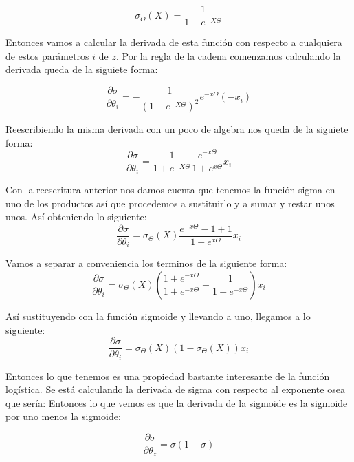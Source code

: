 \begin{equation}
  \sigma_{\Theta}(X) = \dfrac{1}{1+e^{-X\Theta}}
\end{equation}

Entonces vamos a calcular la derivada de esta función con respecto a cualquiera de estos parámetros $i$ de $z$.
Por la regla de la cadena comenzamos calculando la derivada queda de la siguiete forma:

\begin{equation}
 \dfrac{\partial\sigma}{\partial\theta_{i}}= -\dfrac{1}{(1-e^{-X\Theta})^2}e^{-x\Theta}(-x_{i})
\end{equation}

Reescribiendo la misma derivada con un poco de algebra nos queda de la siguiete forma:
\begin{equation}
 \dfrac{\partial\sigma}{\partial\theta_{i}}= \dfrac{1}{1+e^{-X\Theta}}  \dfrac{e^{-x\Theta}}{1+e^{x\Theta}} x_{i}
\end{equation}

Con la reescritura anterior nos damos cuenta que tenemos la función sigma en uno de los productos así que procedemos a sustituirlo y a sumar y restar unos unos. Así obteniendo lo siguiente:
\begin{equation}
 \dfrac{\partial\sigma}{\partial\theta_{i}}= \sigma_{\Theta}(X)\dfrac{e^{-x\Theta}-1+1}{1+e^{x\Theta}} x_{i}
\end{equation}

Vamos a separar a conveniencia los terminos de la siguiente forma:
\begin{equation}
 \dfrac{\partial\sigma}{\partial\theta_{i}}= \sigma_{\Theta}(X)
 \left( \dfrac{1+e^{-x\Theta}}{1+e^{-x\Theta}}-\dfrac{1}{1+e^{-x\Theta}}\right)x_{i}
\end{equation}

Así sustituyendo con la función sigmoide y llevando a uno, llegamos a lo siguiente:
\begin{equation}
 \dfrac{\partial\sigma}{\partial\theta_{i}}= \sigma_{\Theta}(X)
 (1- \sigma_{\Theta}(X))x_{i}
\end{equation}

Entonces lo que tenemos es una propiedad bastante interesante de la función logística. Se está calculando la derivada de sigma con respecto al exponente osea que sería:
Entonces lo que vemos es que la derivada de la sigmoide es la sigmoide por uno menos la sigmoide:

\begin{equation}
 \dfrac{\partial\sigma}{\partial\theta_{z}}= \sigma(1- \sigma)
\end{equation}


